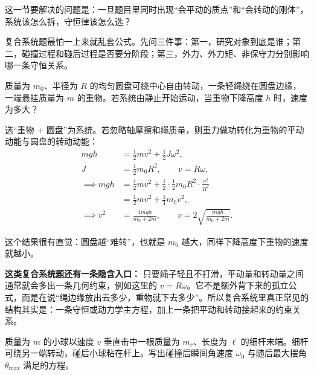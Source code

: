 \documentclass[lang=cn,11pt]{elegantbook}
\begin{document}
这一节要解决的问题是：一旦题目里同时出现“会平动的质点”和“会转动的刚体”，系统该怎么拆，守恒律该怎么选？

\begin{note}
复合系统题最怕一上来就乱套公式。先问三件事：第一，研究对象到底是谁；第二，碰撞过程和碰后过程是否要分阶段；第三，外力、外力矩、非保守力分别影响哪一条守恒关系。
\end{note}

\begin{example}[重物带动圆盘转动]
质量为 \(m_0\)、半径为 \(R\) 的均匀圆盘可绕中心自由转动，一条轻绳绕在圆盘边缘，一端悬挂质量为 \(m\) 的重物。若系统由静止开始运动，当重物下降高度 \(h\) 时，速度为多大？
\end{example}

\begin{solution}
选“重物 + 圆盘”为系统。若忽略轴摩擦和绳质量，则重力做功转化为重物的平动动能与圆盘的转动动能：
\[
\begin{aligned}
mgh&=\frac12 mv^2+\frac12 J\omega^2,\\
J&=\frac12 m_0R^2,\qquad v=R\omega,\\
\implies mgh&=\frac12 mv^2+\frac12\cdot \frac12 m_0R^2\cdot \frac{v^2}{R^2}\\
&=\frac12 mv^2+\frac14 m_0v^2,\\
\implies v^2&=\frac{4mgh}{m_0+2m},\qquad
v=2\sqrt{\frac{mgh}{m_0+2m}}.
\end{aligned}
\]

这个结果很有直觉：圆盘越“难转”，也就是 \(m_0\) 越大，同样下降高度下重物的速度就越小。
\end{solution}

\begin{note}
\textbf{这类复合系统题还有一条隐含入口：} 只要绳子轻且不打滑，平动量和转动量之间通常就会多出一条几何约束，例如这里的 \(v=R\omega\)。它不是额外背下来的孤立公式，而是在说“绳边缘放出去多少，重物就下去多少”。所以复合系统里真正常见的结构其实是：一条守恒或动力学主方程，加上一条把平动和转动接起来的约束关系。
\end{note}

\begin{example}
质量为 \(m\) 的小球以速度 \(v\) 垂直击中一根质量为 \(m_r\)、长度为 \(\ell\) 的细杆末端。细杆可绕另一端转动，碰后小球粘在杆上。写出碰撞后瞬间角速度 \(\omega_0\) 与随后最大摆角 \(\theta_{\max}\) 满足的方程。
\end{example}
\end{document}
